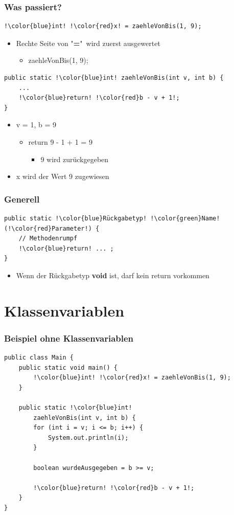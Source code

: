 \documentclass[final]{beamer}
\begin{document}
\begin{frame}[containsverbatim]
	\frametitle{Was passiert?}
	\begin{lstlisting}[escapechar=!]
!\color{blue}int! !\color{red}x! = zaehleVonBis(1, 9);
	\end{lstlisting}
	\begin{itemize}
		\item{Rechte Seite von "\textbf{=}"\ wird zuerst ausgewertet
			\begin{itemize}
				\item{zaehleVonBis(1, 9);}
			\end{itemize}
		}
	\end{itemize}
	\begin{lstlisting}[escapechar=!]
public static !\color{blue}int! zaehleVonBis(int v, int b) {
	...
	!\color{blue}return! !\color{red}b - v + 1!;
}
	\end{lstlisting}
	\begin{itemize}
		\item{v = 1, b = 9
			\begin{itemize}
				\item{return 9 - 1 + 1 = 9}
					\begin{itemize}
						\item{9 wird zurückgegeben}
					\end{itemize}
			\end{itemize}
		}
		\item{{\color{red}x} wird der Wert 9 zugewiesen}
	\end{itemize}
\end{frame}

\begin{frame}[containsverbatim]
	\frametitle{Generell}
	\begin{lstlisting}[escapechar=!]
public static !\color{blue}Rückgabetyp! !\color{green}Name! (!\color{red}Parameter!) {
	// Methodenrumpf
	!\color{blue}return! ... ; 
}
	\end{lstlisting}
	\begin{itemize}
		\item{Wenn der {\color{blue}Rückgabetyp} \textbf{void} ist, darf kein {\color{blue}return} vorkommen}
	\end{itemize}
\end{frame}

\section{Klassenvariablen}
\begin{frame}[containsverbatim]
	\frametitle{Beispiel ohne Klassenvariablen}
	\begin{lstlisting}[escapechar=!]
public class Main {
	public static void main() {
		!\color{blue}int! !\color{red}x! = zaehleVonBis(1, 9);
	}
	
	public static !\color{blue}int! 
		zaehleVonBis(int v, int b) {
		for (int i = v; i <= b; i++) {
			System.out.println(i);
		}
		
		boolean wurdeAusgegeben = b >= v;
		
		!\color{blue}return! !\color{red}b - v + 1!;
	}
}
	\end{lstlisting}
\end{frame}
\end{document}
